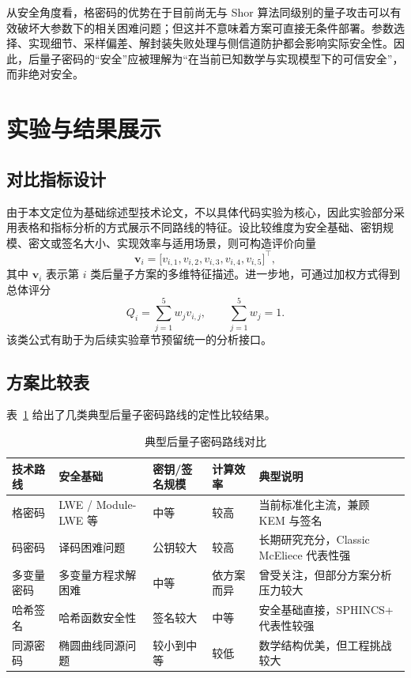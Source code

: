﻿\documentclass[12pt,a4paper]{ctexart}
\numberwithin{equation}{section}
\begin{document}
从安全角度看，格密码的优势在于目前尚无与 Shor 算法同级别的量子攻击可以有效破坏大参数下的相关困难问题；但这并不意味着方案可直接无条件部署。参数选择、实现细节、采样偏差、解封装失败处理与侧信道防护都会影响实际安全性。因此，后量子密码的“安全”应被理解为“在当前已知数学与实现模型下的可信安全”，而非绝对安全。

\section{实验与结果展示}
\subsection{对比指标设计}
由于本文定位为基础综述型技术论文，不以具体代码实验为核心，因此实验部分采用表格和指标分析的方式展示不同路线的特征。设比较维度为安全基础、密钥规模、密文或签名大小、实现效率与适用场景，则可构造评价向量
\begin{equation}
    \bm{v}_i =
    \bigl[
    v_{i,1},
    v_{i,2},
    v_{i,3},
    v_{i,4},
    v_{i,5}
    \bigr]^{\top},
\end{equation}
其中 $\bm{v}_i$ 表示第 $i$ 类后量子方案的多维特征描述。进一步地，可通过加权方式得到总体评分
\begin{equation}
    Q_i = \sum_{j=1}^{5} w_j v_{i,j}, \qquad \sum_{j=1}^{5} w_j = 1.
\end{equation}
该类公式有助于为后续实验章节预留统一的分析接口。

\subsection{方案比较表}
表~\ref{tab:pqc-comparison} 给出了几类典型后量子密码路线的定性比较结果。
\begin{table}[H]
    \centering
    \caption{典型后量子密码路线对比}
    \label{tab:pqc-comparison}
    \begin{tabular}{p{2.8cm}p{2.5cm}p{2.2cm}p{2.2cm}p{2.4cm}}
        \toprule
        技术路线 & 安全基础 & 密钥/签名规模 & 计算效率 & 典型说明 \\
        \midrule
        格密码 & LWE / Module-LWE 等 & 中等 & 较高 & 当前标准化主流，兼顾 KEM 与签名 \\
        码密码 & 译码困难问题 & 公钥较大 & 较高 & 长期研究充分，Classic McEliece 代表性强 \\
        多变量密码 & 多变量方程求解困难 & 中等 & 依方案而异 & 曾受关注，但部分方案分析压力较大 \\
        哈希签名 & 哈希函数安全性 & 签名较大 & 中等 & 安全基础直接，SPHINCS+ 代表性较强 \\
        同源密码 & 椭圆曲线同源问题 & 较小到中等 & 较低 & 数学结构优美，但工程挑战较大 \\
        \bottomrule
    \end{tabular}
\end{table}
\end{document}
